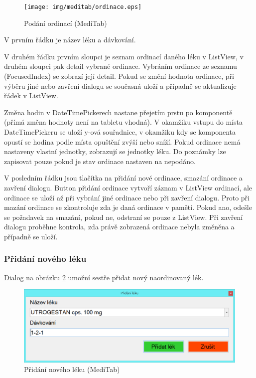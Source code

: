 \begin{figure}[H]
	\centering
	\texttt{[image: img/meditab/ordinace.eps]}
	\caption{Podání ordinací (MediTab)}
  \label{fig:ordinace}
\end{figure}

V prvním řádku je název léku a dávkování.

V druhém řádku prvním sloupci je seznam ordinací daného léku v ListView, v druhém sloupci pak detail vybrané ordinace. Vybráním ordinace ze seznamu (FocusedIndex) se zobrazí její detail. Pokud se změní hodnota ordinace, při výběru jiné nebo zavření dialogu se současná uloží a případně se aktualizuje řádek v ListView.

Změna hodin v DateTimePickerech nastane přejetím prstu po komponentě (přímá změna hodnoty není na tabletu vhodná). V okamžiku vstupu do místa DateTimePickeru se uloží y-ová souřadnice, v okamžiku kdy se komponenta opustí se hodina podle místa opuštění zvýší nebo sníží. Pokud ordinace nemá nastaveny vlastní jednotky, zobrazují se jednotky léku. Do poznámky lze zapisovat pouze pokud je stav ordinace nastaven na nepodáno.

V posledním řádku jsou tlačítka na přidání nové ordinace, smazání ordinace a zavření dialogu. Button přidání ordinace vytvoří záznam v ListView ordinací, ale ordinace se uloží až při vybrání jiné ordinace nebo při zavření dialogu. Proto při mazání ordinace se zkontroluje zda je daná ordinace v paměti. Pokud ano, odešle se požadavek na smazání, pokud ne, odstraní se pouze z ListView. Při zavření dialogu proběhne kontrola, zda právě zobrazená ordinace nebyla změněna a případně se uloží.


\subsubsection{Přidání nového léku}
\label{ch:pridat_lek}

Dialog na obrázku \ref{fig:medikace_pridat_lek} umožní sestře přidat nový naordinovaný lék.

\begin{figure}[H]
	\centering
	\includegraphics[width=1\textwidth]{img/meditab/medikace_pridat_lek.eps}
	\caption{Přidání nového léku (MediTab)}
  \label{fig:medikace_pridat_lek}
\end{figure}


